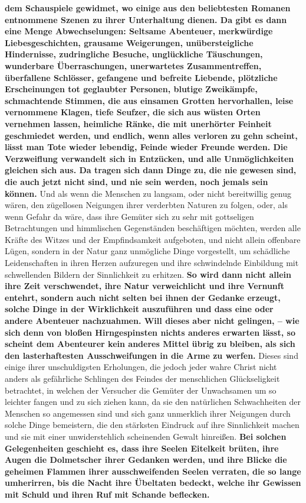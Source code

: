 \textbf{dem Schauspiele
gewidmet, wo einige aus den beliebtesten Romanen
entnommene Szenen zu
ihrer
Unterhaltung dienen. Da gibt es dann eine Menge Abwechselungen: Seltsame
Abenteuer, merkwürdige Liebesgeschichten, grausame Weigerungen,
unübersteigliche Hindernisse, zudringliche Besuche, unglückliche Täuschungen,
wunderbare Überraschungen, unerwartetes Zusammentreffen, überfallene Schlösser,
gefangene und befreite Liebende, plötzliche Erscheinungen tot geglaubter
Personen, blutige Zweikämpfe, schmachtende Stimmen, die aus einsamen Grotten
hervorhallen, leise vernommene Klagen, tiefe Seufzer, die sich aus wüsten
Orten vernehmen lassen, heimliche Ränke, die mit unerhörter Feinheit
geschmiedet werden, und endlich, wenn alles verloren zu gehn scheint, lässt man
Tote wieder lebendig, Feinde wieder Freunde werden. Die Verzweiflung verwandelt
sich in Entzücken, und alle Unmöglichkeiten gleichen sich aus. Da tragen sich
dann Dinge zu, die nie gewesen sind, die auch jetzt nicht sind, und nie sein
werden, noch jemals sein können.} Und als wenn die Menschen zu langsam, oder
nicht bereitwillig genug wären, den zügellosen Neigungen ihrer verderbten
Naturen zu folgen, oder, als wenn Gefahr da wäre, dass ihre Gemüter sich zu sehr
mit gottseligen Betrachtungen und himmlischen Gegenständen beschäftigen möchten,
werden alle Kräfte des Witzes und der Empfindsamkeit aufgeboten, und nicht
allein
offenbare Lügen, sondern in der Natur ganz unmögliche Dinge vorgestellt, um
schädliche Leidenschaften in ihren Herzen aufzuregen und ihre schwindelnde
Einbildung mit schwellenden Bildern der Sinnlichkeit zu erhitzen.
\label{ref:17_01_schauspiel_2}
\textbf{So wird dann
nicht allein ihre Zeit verschwendet, ihre Natur verweichlicht und ihre Vernunft
entehrt, sondern auch nicht selten bei ihnen der Gedanke erzeugt, solche Dinge
in der Wirklichkeit auszuführen und dass eine oder andere Abenteuer nachzuahmen.
Will dieses aber nicht gelingen, -- wie sich denn von bloßen Hirngespinsten
nichts anderes erwarten lässt, so scheint dem Abenteurer kein anderes Mittel
übrig
zu bleiben, als sich den lasterhaftesten Ausschweifungen in die Arme zu werfen.}
Dieses sind einige ihrer unschuldigsten Erholungen, die jedoch jeder wahre
Christ nicht anders als gefährliche Schlingen des Feindes der menschlichen
Glückseligkeit betrachtet, in welchen der Versucher die Gemüter der Unwachsamen
um so leichter fangen und zu sich ziehen kann, da sie den natürlichen
Schwachheiten der Menschen so angemessen sind und sich ganz unmerklich ihrer
Neigungen durch solche Dinge bemeistern, die den stärksten Eindruck auf ihre
Sinnlichkeit machen und sie mit einer unwiderstehlich scheinenden Gewalt
hinreißen. \textbf{Bei solchen Gelegenheiten geschieht es, dass ihre Seelen
Eitelkeit
brüten, ihre Augen die Dolmetscher ihrer Gedanken werden, und ihre Blicke die
geheimen Flammen ihrer ausschweifenden Seelen verraten, die so lange
umherirren, bis die Nacht ihre Übeltaten bedeckt, welche ihr Gewissen mit
Schuld und ihren Ruf mit Schande beflecken.}

